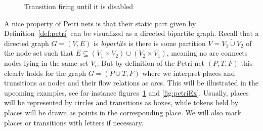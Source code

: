 \documentclass[
  paper=a4,
  titlepage,
  bibliography=totoc,
  listof=totoc,
  pagesize=pdftex
]{scrartcl}
\numberwithin{figure}{section}
\numberwithin{equation}{section}
\numberwithin{table}{section}
\newcommand*\dotcup{\mathbin{\dot{\cup}}}
\theoremstyle{definition}
\numberwithin{definition}{section}
\begin{document}
\begin{figure}[htbp]
  \centering
  \caption{Transition firing until it is disabled}
  \label{fig:firing}
\end{figure}

A nice property of Petri nets is that their static part given by
Definition~\ref{def:petri} can be visualized as a directed bipartite graph. Recall that a
directed graph $G = (V,E)$ is \emph{bipartite} is there is some partition $V = V_1 \dotcup
V_2$ of the node set such that $E \subseteq (V_1 \times V_2) \cup (V_2 \times V_1)$,
meaning no arc connects nodes lying in the same set $V_i$. But by definition of the Petri
net $(P,T,F)$ this clearly holds for the graph $G = (P \cup T, F)$ where we interpret
places and transitions as nodes and their flow relations as arcs. This will be illustrated
in the upcoming examples, see for instance figures~\ref{fig:firing} and \ref{fig:petriEx}.
Usually, places will be represented by circles and transitions as boxes, while tokens held
by places will be drawn as points in the corresponding place. We will also mark places or
transitions with letters if necessary.
\end{document}
